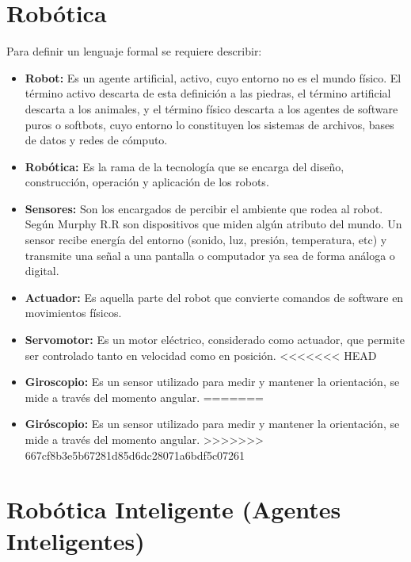 \section{Robótica} \label{sect:robotica}
 
Para definir un lenguaje formal se requiere describir:
\begin{itemize}
\item{\textbf{Robot:} Es un agente artificial, activo, cuyo entorno no es el mundo físico. El término activo descarta de esta definición a las piedras, el término artificial descarta a los animales, y el término físico descarta a los agentes de software puros o softbots, cuyo entorno lo constituyen los sistemas de archivos, bases de datos y redes de cómputo. \cite{peterNorvig}}

\item{\textbf{Robótica:} Es la rama de la tecnología que se encarga del diseño, construcción, operación y aplicación de los robots. \cite{oxfordRobotics}}

\item{\textbf{Sensores:}  Son los encargados de percibir el ambiente que rodea al robot. Según Murphy R.R son dispositivos que miden algún atributo del mundo. Un sensor recibe energía del entorno (sonido, luz, presión, temperatura, etc) y transmite una señal a una pantalla o computador ya sea de forma análoga o digital. \cite{AiRobotics}}

\item{\textbf{Actuador:}  Es aquella parte del robot que convierte comandos de software en movimientos físicos.  \cite{peterNorvig}}

\item{\textbf{Servomotor:}  Es un motor eléctrico, considerado como actuador, que permite ser controlado tanto en velocidad como en posición. }
<<<<<<< HEAD
\item{\textbf{Giroscopio:} Es un sensor utilizado para medir y mantener la orientación, se mide a través del momento angular. \cite{gyro1}}
=======

\item{\textbf{Giróscopio:} Es un sensor utilizado para medir y mantener la orientación, se mide a través del momento angular. \cite{gyro1}}
>>>>>>> 667cf8b3e5b67281d85d6dc28071a6bdf5c07261
\end{itemize}

\section{Robótica Inteligente (Agentes Inteligentes)} \label{sect:AgentesInteligentes}
